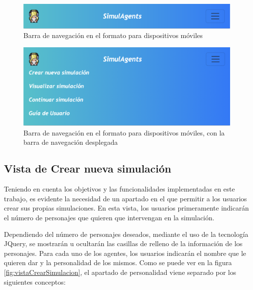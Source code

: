 \begin{figure}[H]
	\centering
	\includegraphics[width = 1\textwidth]{Imagenes/Vectorial/navBarMobile1.png}
	\caption{Barra de navegación en el formato para dispositivos móviles}
	\label{fig:navBarMobile1}
\end{figure}

\begin{figure}[H]
	\centering
	\includegraphics[width = 1\textwidth]{Imagenes/Vectorial/navBarMobile2.png}
	\caption{Barra de navegación en el formato para dispositivos móviles, con la barra de navegación desplegada}
	\label{fig:navBarMobile2}
\end{figure}

\subsection{Vista de Crear nueva simulación}

Teniendo en cuenta los objetivos y las funcionalidades implementadas en este trabajo, es evidente la necesidad de un apartado en el que permitir a los usuarios crear sus propias simulaciones. En esta vista, los usuarios primeramente indicarán el número de personajes que quieren que intervengan en la simulación.

Dependiendo del número de personajes deseados, mediante el uso de la tecnología JQuery, se mostrarán u ocultarán las casillas de relleno de la información de los personajes. Para cada uno de los agentes, los usuarios indicarán el nombre que le quieren dar y la personalidad de los mismos. Como se puede ver en la figura \ref{fig:vistaCrearSimulacion}, el apartado de personalidad viene separado por los siguientes conceptos:

